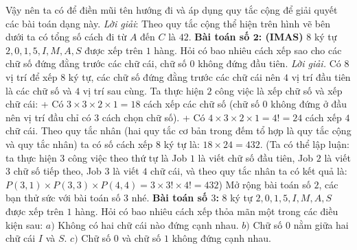 \begin{multicols}{2}
\begin{figure}[H]
\begin{figure}[H]
				\vspace*{-15pt}
			\end{figure}
			\vspace*{-15pt}
		\end{figure}
		Vậy nên ta có để điền mũi tên hướng đi và áp dụng quy tắc cộng để giải quyết các bài toán dạng này.
		\vskip 0.1cm
		\textit{Lời giải}: Theo quy tắc cộng thể hiện trên hình vẽ bên dưới ta có tổng số cách đi từ $A$ đến $C$ là $42$.
	\vskip 0.1cm
	\textbf{\color{toancuabi}Bài toán số $\pmb{2}$: (IMAS)}
	\vskip 0.1cm
	$8$ ký tự $2,0,1,5,I,M,A,S$ được xếp trên $1$ hàng. Hỏi có bao nhiêu cách xếp sao cho các chữ số đứng đằng trước các chữ cái, chữ số $0$ không đứng đầu tiên.
	\vskip 0.1cm
	\textit{Lời giải.}
	Có $8$ vị trí để xếp $8$ ký tự, các chữ số đứng đằng trước các chữ cái nên $4$ vị trí đầu tiên là các chữ số và $4$ vị trí sau cùng. Ta thực hiện $2$ công việc là xếp chữ số và xếp chữ cái:
	\vskip 0.1cm
	+ Có $3\times3\times2\times1=18$ cách xếp các chữ số (chữ số $0$ không đứng ở đầu nên vị trí đầu chỉ có $3$ cách chọn chữ số).
	\vskip 0.1cm
	+ Có $4\times3\times2\times1=4!=24$ cách xếp $4$ chữ cái.
	\vskip 0.1cm
	Theo quy tắc nhân (hai quy tắc cơ bản trong đếm tổ hợp là quy tắc cộng và quy tắc nhân) ta có số cách xếp $8$ ký tự là: $18\times24=432$.
	\vskip 0.1cm
	(Ta có thể lập luận: ta thực hiện $3$ công việc theo thứ tự là Job $1$ là viết chữ số đầu tiên, Job $2$ là viết $3$ chữ số tiếp theo, Job $3$ là viết $4$ chữ cái, và theo quy tắc nhân ta có kết quả là: $P(3,1)\times P(3,3)\times P(4,4)=3\times3!\times4!=432$)
	\vskip 0.1cm
	Mở rộng bài toán số $2$, các bạn thử sức với bài toán số $3$ nhé.
	\vskip 0.1cm
	\textbf{\color{toancuabi}Bài toán số $3$:}
	\vskip 0.1cm
	$8$ ký tự $2,0,1,5,I,M,A,S$ được xếp trên $1$ hàng. Hỏi có bao nhiêu cách xếp thỏa mãn một trong các điều kiện sau:
	\vskip 0.1cm
	$a)$ Không có hai chữ cái nào đứng cạnh nhau.
	\vskip 0.1cm
	$b)$ Chữ số $0$ nằm giữa hai chữ cái $I$ và $S$.
	\vskip 0.1cm
	$c)$ Chữ số $0$ và chữ số $1$ không đứng cạnh nhau.

\end{multicols}
